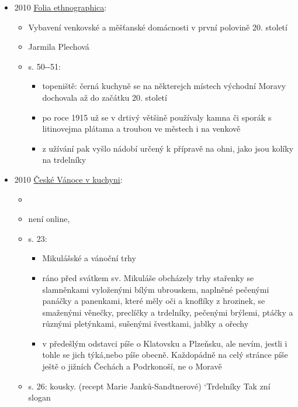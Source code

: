 \begin{itemize}
  \begin{itemize}
  \tightlist
  \item
    není online, 
  \item
    s. 224: Každá hospodyň napékla deň před tým vdolků lebo trdláčů,
    všecko
  \end{itemize}
\item
  2010
  \href{https://ndk.cz/uuid/uuid:41ed2580-5e9b-11e4-8b87-001018b5eb5c}{Folia
  ethnographica}:

  \begin{itemize}
  \tightlist
  \item
    Vybavení venkovské a měšťanské domácnosti v první polovině 20.
    století
  \item
    Jarmila Plechová
  \item
    s. 50-\/-51:

    \begin{itemize}
    \tightlist
    \item
      topeniště: černá kuchyně se na některejch místech východní Moravy
      dochovala až do začátku 20. století
    \item
      po roce 1915 už se v drtivý většině používaly kamna či sporák s
      litinovejma plátama a troubou ve městech i na venkově
    \item
      z užívání pak vyšlo nádobí určený k přípravě na ohni, jako jsou
      kolíky na trdelníky
    \end{itemize}
  \end{itemize}
\item
  2010
  \href{https://ceskadigitalniknihovna.cz/uuid/uuid:0aef9650-0ddf-11e5-9eb3-005056827e52}{České
  Vánoce v kuchyni}:

  \begin{itemize}
  \tightlist
  \item
  \item
    není online,
  \item
    s. 23:

    \begin{itemize}
    \tightlist
    \item
      Mikulášské a vánoční trhy
    \item
      ráno před svátkem sv. Mikuláše obcházely trhy stařenky se
      slamněnkami vyloženými bílým ubrouskem, naplněné pečenými panáčky
      a panenkami, které měly oči a knoflíky z hrozinek, se smaženými
      věnečky, preclíčky a trdelníky, pečenými brýlemi, ptáčky a různými
      pletýnkami, sušenými švestkami, jablky a ořechy
    \item
      v předešlým odstavci píše o Klatovsku a Plzeňsku, ale nevím,
      jestli i tohle se jich týká,nebo píše obecně. Každopádně na celý
      stránce píše ještě o jižních Čechách a Podrkonoší, ne o Moravě
    \end{itemize}
  \item
    s. 26: kousky. (recept Marie Janků-Sandtnerové) `Trdelníky Tak zní
    slogan


\end{itemize}
\end{itemize}

